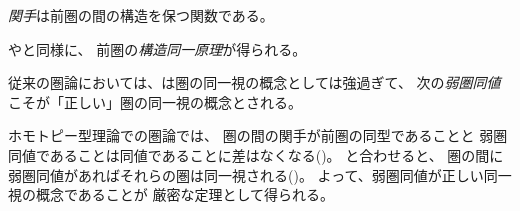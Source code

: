 \documentclass[index]{subfiles}
\begin{document}

\emph{関手}は前圏の間の構造を保つ関数である。





やと同様に、
前圏の\emph{構造同一原理}が得られる。




従来の圏論においては、は圏の同一視の概念としては強過ぎて、
次の\emph{弱圏同値}こそが「正しい」圏の同一視の概念とされる。



ホモトピー型理論での圏論では、
圏の間の関手が前圏の同型であることと
弱圏同値であることは同値であることに差はなくなる()。
と合わせると、
圏の間に弱圏同値があればそれらの圏は同一視される()。
よって、弱圏同値が正しい同一視の概念であることが
厳密な定理として得られる。







\end{document}
